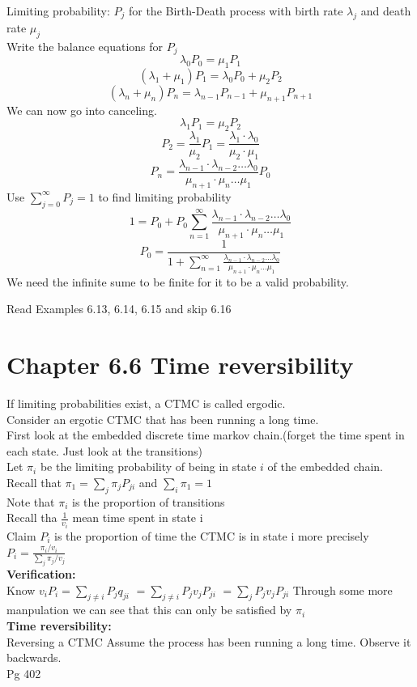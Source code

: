 \documentclass[answers,12pt,addpoints]{exam}
\begin{document}
\begin{example}
    Limiting probability: $P_j$ for the Birth-Death process with birth rate $\lambda_j$ and death rate $\mu_j$\\
    Write the balance equations for $P_j$\\
    $$ \lambda_{0} P_{0} = \mu_1 P_1$$
    $$ (\lambda_{1} + \mu_1) P_1 = \lambda_0 P_0 + \mu_2 P_2$$
    $$ (\lambda_{n} + \mu_n) P_n = \lambda_{n-1} P_{n-1} + \mu_{n+1} P_{n+1}$$
    We can now go into canceling. 
    $$ \lambda_{1} P_1 = \mu_2 P_2$$
    $$ P_2 = \frac{\lambda_1}{\mu_2} P_1 = \frac{\lambda_1 \cdot \lambda_0}{\mu_2 \cdot \mu_1}$$
    $$ P_n = \frac{\lambda_{n-1} \cdot \lambda_{n-2} \dots \lambda_0}{\mu_{n+1} \cdot \mu_{n} \dots \mu_1} P_0$$
    Use $\sum_{j=0}^{\infty} P_j = 1$ to find limiting probability\\
    $$ 1 = P_0 + P_0 \sum_{n=1}^{\infty} \frac{\lambda_{n-1} \cdot \lambda_{n-2} \dots \lambda_0}{\mu_{n+1} \cdot \mu_{n} \dots \mu_1}$$
    $$ P_0 = \frac{1}{1 + \sum_{n=1}^{\infty} \frac{\lambda_{n-1} \cdot \lambda_{n-2} \dots \lambda_0}{\mu_{n+1} \cdot \mu_{n} \dots \mu_1}}$$
    We need the infinite sume to be finite for it to be a valid probability.
\end{example}

Read Examples 6.13, 6.14, 6.15 and skip 6.16\\

\section*{Chapter 6.6 Time reversibility}
If limiting probabilities exist, a CTMC is called ergodic.\\
Consider an ergotic CTMC that has been running a long time.\\
First look at the embedded discrete time markov chain.(forget the time spent in each state. Just look at the transitions)\\
Let $\pi_i$ be the limiting probability of being in state $i$ of the embedded chain.\\
Recall that $\pi_1 = \sum_j \pi_j P_{ji}$ and $\sum_i \pi_1 = 1 $\\
Note that $\pi_i$ is the proportion of transitions\\
Recall tha $\frac{1}{v_i}$ mean time spent in state i\\
Claim $P_i$ is the proportion of time the CTMC is in state i more precisely $P_i = \frac{\pi_i/v_i}{\sum_j \pi_j/v_j}$\\
\textbf{Verification:}\\ 
Know $v_i P_i = \sum_{j \neq i} P_j q_{ji} $
$ = \sum_{j \neq i} P_j v_j P_{ji}$
$ = \sum_{j} P_j v_j P_{ji} $
Through some more manpulation we can see that this can only be satisfied by $\pi_i$\\
\textbf{Time reversibility:}\\
Reversing a CTMC Assume the process has been running a long time. Observe it backwards.\\
Pg 402
\end{document}
